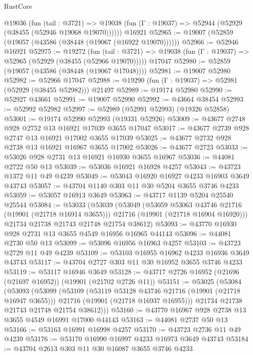 \begin{lexlean}{RustCore}
\begin{coremodule}
    @19036
      (fun (tail : @3721) =>
      @19038 (fun (Γ : @19037) => @52944 (@52929 (@38455 (@52946 @19068 @19070))))))
    @16921
@52965 := @19007 (@52859 (@19057 (@43586 (@38448 (@19067 (@16922 @19070))))))
@52966 := @52946 @16921
@52975 := @19272
    (fun (tail : @3721) => @19038 (fun (Γ : @19037) => @52965 (@52929 (@38455 (@52966 @19070)))))
    @17047
@52980 := @52859 (@19057 (@43586 (@38448 (@19067 @17048))))
@52981 := @19007 @52980
@52982 := @52966 @17047
@52988 := @19290 (fun (Γ : @19037) => @52981 (@52929 (@38455 @52982))) @21497
@52989 := @19174 @52980
@52990 := @52927 @43661
@52991 := @19007 @52990
@52992 := @43664 @38454
@52993 := @52992 @52982
@52997 := @52989 (@52991 @52993) (@19326 @52858)
@53001 := @19174 @52990 @52993 (@19331 @52926)
@53009 := @43677 @2748 @928 @2752 @13 @16921 @17039 @3655 @17047
@53017 := @43677 @2739 @928 @2747 @13 @16921 @17002 @3655 @17039
@53025 := @43677 @2732 @928 @2738 @13 @16921 @16967 @3655 @17002
@53026 := @43677 @2723
@53033 := @53026 @928 @2731 @13 @16921 @16930 @3655 @16967
@53036 := @44081 @2722 @50 @13
@53039 := @53036 @16921 @16928 @4257
@53043 := @43723 @1372 @11 @49 @4239
@53049 := @53043 @16920 @16927 @4233 @16903 @3649 @43743
@53057 := @43704 @1140 @303 @11 @30 @5204 @3655 @3746 @4233
@53059 := @53057 @16913 @3649
@53063 := @43717 @1139 @5204 @25540 @25544
@53084 := @53033
    (@53039
      (@53049
        (@53059 @53063 @43746 @21716 (@19901 (@21718 @16914 @3655)))
        @21716
        (@19901 (@21718 @16904 @16920)))
      @21734
      @21738
      @21743
      @21748
      @21754
      @38612)
@53093 := @43770 @16930 @928 @2731 @13 @3655 @4549 @16956 @16965 @44143
@53096 := @44081 @2730 @50 @13
@53099 := @53096 @16956 @16963 @4257
@53103 := @43723 @2729 @11 @49 @4239
@53109 := @53103 @16955 @16962 @4233 @16936 @3649 @43743
@53117 := @43704 @2727 @303 @11 @30 @16952 @3655 @3746 @4233
@53119 := @53117 @16946 @3649
@53128 := @43717 @2726 @16952 (@21696 (@21697 @16952)) (@19901 (@21702 @2726 @11))
@53151 := @53025
    (@53084
      (@53093
        (@53099
          (@53109
            (@53119 @53128 @43746 @21716 (@19901 (@21718 @16947 @3655)))
            @21716
            (@19901 (@21718 @16937 @16955)))
          @21734
          @21738
          @21743
          @21748
          @21754
          @38612)))
@53160 := @43770 @16967 @928 @2738 @13 @3655 @4549 @16991 @17000 @44143
@53163 := @44081 @2737 @50 @13
@53166 := @53163 @16991 @16998 @4257
@53170 := @43723 @2736 @11 @49 @4239
@53176 := @53170 @16990 @16997 @4233 @16973 @3649 @43743
@53184 := @43704 @2613 @303 @11 @30 @16087 @3655 @3746 @4233

\end{coremodule}
\end{lexlean}
